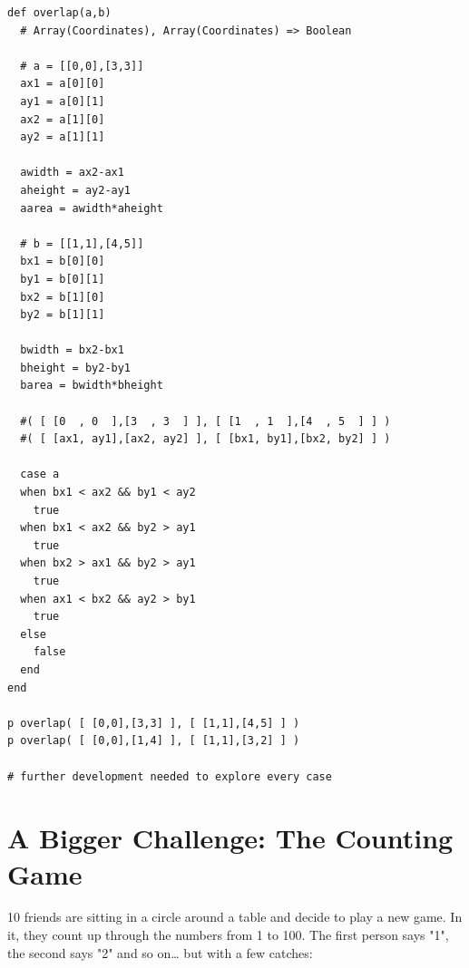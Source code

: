 \documentclass[11pt]{article}
\begin{document}
\begin{verbatim}
def overlap(a,b)
  # Array(Coordinates), Array(Coordinates) => Boolean

  # a = [[0,0],[3,3]]
  ax1 = a[0][0]
  ay1 = a[0][1] 
  ax2 = a[1][0]
  ay2 = a[1][1]

  awidth = ax2-ax1
  aheight = ay2-ay1
  aarea = awidth*aheight

  # b = [[1,1],[4,5]]
  bx1 = b[0][0]
  by1 = b[0][1]
  bx2 = b[1][0]
  by2 = b[1][1]

  bwidth = bx2-bx1
  bheight = by2-by1
  barea = bwidth*bheight

  #( [ [0  , 0  ],[3  , 3  ] ], [ [1  , 1  ],[4  , 5  ] ] )
  #( [ [ax1, ay1],[ax2, ay2] ], [ [bx1, by1],[bx2, by2] ] )

  case a
  when bx1 < ax2 && by1 < ay2
    true
  when bx1 < ax2 && by2 > ay1
    true
  when bx2 > ax1 && by2 > ay1
    true
  when ax1 < bx2 && ay2 > by1
    true
  else
    false
  end
end

p overlap( [ [0,0],[3,3] ], [ [1,1],[4,5] ] )
p overlap( [ [0,0],[1,4] ], [ [1,1],[3,2] ] )

# further development needed to explore every case
\end{verbatim}

\section{A Bigger Challenge: The Counting Game}
\label{sec-2}

10 friends are sitting in a circle around a table and decide to play a new 
game. In it, they count up through the numbers from 1 to 100. The first person
says "1", the second says "2" and so on\ldots{} but with a few catches:
\end{document}
